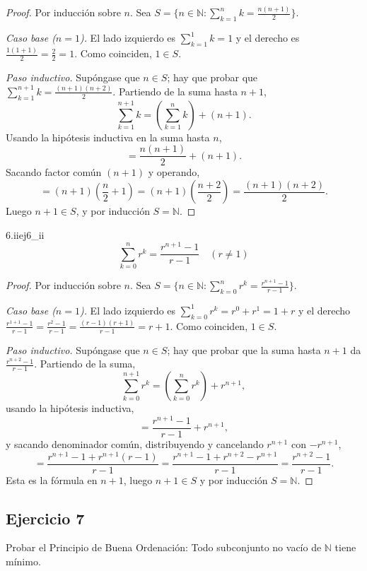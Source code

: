 \documentclass[11pt, a4paper]{article}
\begin{document}
\begin{proof}
Por inducción sobre $n$. Sea $S = \{ n \in \mathbb{N} : \sum_{k=1}^{n}k=\frac{n(n+1)}{2} \}$.

\textit{Caso base ($n=1$).} El lado izquierdo es $\sum_{k=1}^{1} k = 1$ y el derecho es
$\frac{1(1+1)}{2} = \frac{2}{2} = 1$. Como coinciden, $1 \in S$.

\textit{Paso inductivo.} Supóngase que $n \in S$; hay que probar que
$\sum_{k=1}^{n+1}k = \frac{(n+1)(n+2)}{2}$. Partiendo de la suma hasta $n+1$,
$$ \sum_{k=1}^{n+1}k = \left( \sum_{k=1}^{n}k \right) + (n+1). $$
Usando la hipótesis inductiva en la suma hasta $n$,
$$ = \frac{n(n+1)}{2} + (n+1). $$
Sacando factor común $(n+1)$ y operando,
$$ = (n+1) \left( \frac{n}{2} + 1 \right) = (n+1) \left( \frac{n+2}{2} \right) = \frac{(n+1)(n+2)}{2}. $$
Luego $n+1 \in S$, y por inducción $S = \mathbb{N}$.
\end{proof}

\begin{proposicion}{6.ii}{ej6_ii}
$$ \sum_{k=0}^{n}r^{k}=\frac{r^{n+1}-1}{r-1} \quad (r \neq 1) $$
\end{proposicion}

\begin{proof}
Por inducción sobre $n$. Sea $S = \{ n \in \mathbb{N} : \sum_{k=0}^{n}r^{k}=\frac{r^{n+1}-1}{r-1} \}$.

\textit{Caso base ($n=1$).} El lado izquierdo es $\sum_{k=0}^{1} r^k = r^0 + r^1 = 1 + r$ y el
derecho $\frac{r^{1+1}-1}{r-1} = \frac{r^2-1}{r-1} = \frac{(r-1)(r+1)}{r-1} = r+1$. Como coinciden,
$1 \in S$.

\textit{Paso inductivo.} Supóngase que $n \in S$; hay que probar que la suma hasta $n+1$ da
$\frac{r^{n+2}-1}{r-1}$. Partiendo de la suma,
$$ \sum_{k=0}^{n+1} r^k = \left( \sum_{k=0}^{n} r^k \right) + r^{n+1}, $$
usando la hipótesis inductiva,
$$ = \frac{r^{n+1}-1}{r-1} + r^{n+1}, $$
y sacando denominador común, distribuyendo y cancelando $r^{n+1}$ con $-r^{n+1}$,
$$ = \frac{r^{n+1}-1 + r^{n+1}(r-1)}{r-1} = \frac{r^{n+1} - 1 + r^{n+2} - r^{n+1}}{r-1}
= \frac{r^{n+2} - 1}{r-1}. $$
Esta es la fórmula en $n+1$, luego $n+1 \in S$ y por inducción $S = \mathbb{N}$.
\end{proof}

\subsection*{Ejercicio 7}

Probar el Principio de Buena Ordenación: Todo subconjunto no vacío de $\mathbb{N}$ tiene mínimo.
\end{document}
